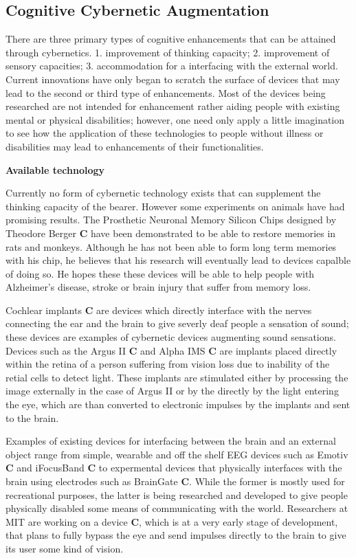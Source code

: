 \subsection{Cognitive Cybernetic Augmentation}

There are three primary types of cognitive enhancements that can be attained through cybernetics. 1. improvement of thinking capacity; 2. improvement of sensory capacities; 3. accommodation for a interfacing with the external world. Current innovations have only began to scratch the surface of devices that may lead to the second or third type of enhancements. Most of the devices being researched are not intended for enhancement rather aiding people with existing mental or physical disabilities; however, one need only apply a little imagination to see how the application of these technologies to people without illness or disabilities may lead to enhancements of their functionalities.

{\bf Available technology}

Currently no form of cybernetic technology exists that can supplement the thinking capacity of the bearer. However some experiments on animals have had promising results. The Prosthetic Neuronal Memory Silicon Chips designed by Theodore Berger {\bf C} have been demonstrated to be able to restore memories in rats and monkeys. Although he has not been able to form long term memories with his chip, he believes that his research will eventually lead to devices capalble of doing so. He hopes these these devices will be able to help people with Alzheimer's disease, stroke or brain injury that suffer from memory loss.

Cochlear implants {\bf C} are devices which directly interface with the nerves connecting the ear and the brain to give severly deaf people a sensation of sound; these devices are examples of cybernetic devices augmenting sound sensations. Devices such as the Argus II {\bf C} and Alpha IMS {\bf C} are implants placed directly within the retina of a person suffering from vision loss due to inability of the retial cells to detect light. These implants are stimulated either by processing the image externally in the case of Argus II or by the directly by the light entering the eye, which are than converted to electronic impulses by the implants and sent to the brain. 

Examples of existing devices for interfacing between the brain and an external object range from simple, wearable and off the shelf EEG devices such as Emotiv {\bf C} and iFocusBand {\bf C} to expermental devices that physically interfaces with the brain using electrodes such as BrainGate {\bf C}. While the former is mostly used for recreational purposes, the latter is being researched and developed to give people physically disabled some means of communicating with the world. Researchers at MIT are working on a device {\bf C}, which is at a very early stage of development, that plans to fully bypass the eye and send impulses directly to the brain to give its user some kind of vision.


